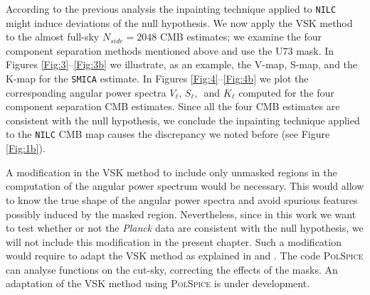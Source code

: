 According to the previous analysis the inpainting technique applied to \texttt{NILC} might induce deviations of the null hypothesis. We now apply the VSK method to the almost full-sky $N_{side}=2048$ CMB estimates; we examine the four component separation methods mentioned above and use the U73 mask. In Figures \ref{Fig:3}--\ref{Fig:3b} we illustrate, as an example, the V-map, S-map, and the K-map for the \texttt{SMICA} estimate. In Figures \ref{Fig:4}--\ref{Fig:4b} we plot the corresponding angular power spectra $V_{\ell},\, S_{\ell},\, $ and $K_{\ell}$ computed for the four component separation CMB estimates. Since all the four CMB estimates are consistent with the null hypothesis, we conclude the inpainting technique applied to the \texttt{NILC} CMB map causes the discrepancy we noted before (see Figure \ref{Fig:1b}). %

A modification in the VSK method to include only unmasked regions in the computation of the angular power spectrum would be necessary. This would allow to know the true shape of the angular power spectra and avoid spurious features possibly induced by the masked region. Nevertheless, since in this work we want to test whether or not the \textit{Planck} data are consistent with the null hypothesis, we will not include  this modification in the present chapter. Such a modification would require to adapt the VSK method as explained in \cite{Gorski:1994ye} and \cite{Hivon:2001jp}. The code \textsc{PolSpice} can analyse functions on the cut-sky, correcting the effects of the masks. An adaptation of the VSK method using \textsc{PolSpice} is under development. 

